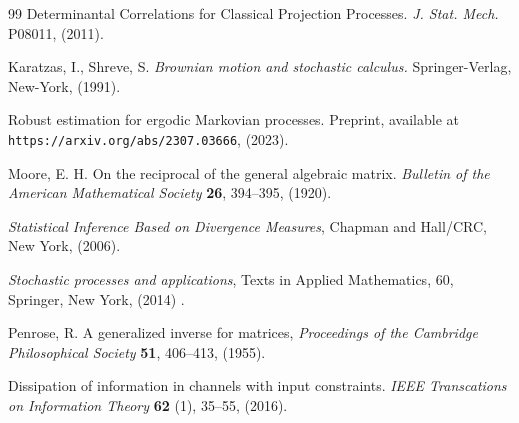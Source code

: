 \documentclass[12pt,thmsa]{article}
\begin{document}
\begin{thebibliography}{99}
 Determinantal Correlations for Classical Projection Processes. {\it J. Stat. Mech.} P08011, (2011).

 {\sc Karatzas, I., Shreve, S.} {\it Brownian motion and stochastic calculus.}  Springer-Verlag, New-York, (1991).


 Robust estimation for ergodic Markovian processes. {Preprint}, available at {\tt https://arxiv.org/abs/2307.03666}, (2023). 

 {\sc Moore, E. H.} On the reciprocal of the general algebraic matrix. {\it Bulletin of the American Mathematical Society} {\bf 26}, 394--395, (1920).

 {\it Statistical Inference Based on Divergence Measures}, Chapman and Hall/CRC, New York, (2006).

 {\it Stochastic processes and applications}, Texts in Applied Mathematics, 60, Springer, New York, (2014) .

 {\sc Penrose, R.} A generalized inverse for matrices, {\it Proceedings of the Cambridge Philosophical Society} {\bf 51}, 406--413, (1955).

 Dissipation of information in channels with input constraints. {\it IEEE Transcations on Information Theory}  {\bf 62} (1), 35--55, (2016).

\end{thebibliography}
\end{document}
